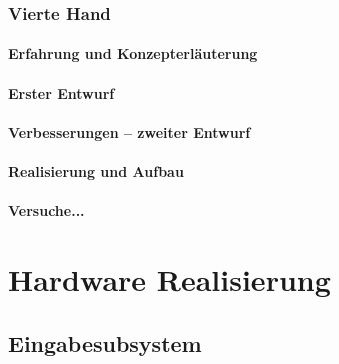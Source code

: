 \documentclass[titlepage,12pt,twoside]{article}
\begin{document}
\subsubsection{Vierte Hand}
\paragraph{Erfahrung und Konzepterläuterung}
\hfill \break
\hfill \break

\paragraph{Erster Entwurf}
\hfill \break
\hfill \break

\paragraph{Verbesserungen – zweiter Entwurf}
\hfill \break
\hfill \break

\paragraph{Realisierung und Aufbau}
\hfill \break
\hfill \break

\paragraph{Versuche...}
\hfill \break
\hfill \break


\section{Hardware Realisierung}

\subsection{Eingabesubsystem}
\end{document}
